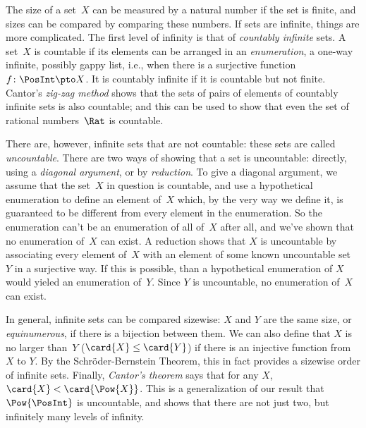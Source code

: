 The size of a set~$X$ can be measured by a natural number if the set
is finite, and sizes can be compared by comparing these numbers. If sets
are infinite, things are more complicated. The first level of
infinity is that of \emph{countably infinite} sets. A set~$X$ is
countable if its elements can be arranged in an \emph{enumeration}, a
one-way infinite, possibly gappy list, i.e., when there is a
surjective function~$f\colon \PosInt \pto X$. It is countably infinite
if it is countable but not finite. Cantor's \emph{zig-zag method}
shows that the sets of pairs of elements of countably infinite sets is
also countable; and this can be used to show that even the set of
rational numbers~$\Rat$ is countable.

There are, however, infinite sets that are not countable: these sets
are called \emph{uncountable}. There are two ways of showing that a
set is uncountable: directly, using a \emph{diagonal argument}, or by
\emph{reduction}. To give a diagonal argument, we assume that the
set~$X$ in question is countable, and use a hypothetical enumeration
to define an element of~$X$ which, by the very way we define it, is
guaranteed to be different from every element in the enumeration. So
the enumeration can't be an enumeration of all of~$X$ after all, and
we've shown that no enumeration of~$X$ can exist. A reduction shows
that $X$ is uncountable by associating every element of~$X$ with an
element of some known uncountable set~$Y$ in a surjective way. If
this is possible, than a hypothetical enumeration of $X$ would yieled
an enumeration of~$Y$. Since $Y$ is uncountable, no enumeration of~$X$
can exist.

In general, infinite sets can be compared sizewise: $X$ and $Y$ are
the same size, or \emph{equinumerous}, if there is a bijection between
them. We can also define that $X$ is no larger than~$Y$ ($\card{X} \le
\card{Y}$) if there is an injective function from $X$ to
$Y$. By the Schr\"oder-Bernstein Theorem, this in fact provides a
sizewise order of infinite sets. Finally, \emph{Cantor's theorem}
says that for any $X$, $\card{X} < \card{\Pow{X}}$. This is a
generalization of our result that $\Pow{\PosInt}$ is uncountable, and
shows that there are not just two, but infinitely many levels of
infinity.
